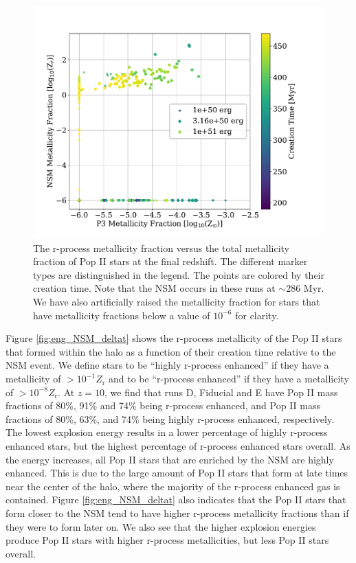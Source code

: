 \documentclass[fleqn,usenatbib]{mnras}
\begin{document}
\begin{figure} 
	\includegraphics[width=\columnwidth]{plots/eng_NSM_tot.pdf}
	\caption[R-process metallicity fraction versus the total metallicity fraction for Pop II stars in the explosion energy variation runs.]{The r-process metallicity fraction versus the total metallicity fraction of Pop II stars at the final redshift. The different marker types are distinguished in the legend. The points are colored by their creation time. Note that the NSM occurs in these runs at $\sim 286$ Myr. We have also artificially raised the metallicity fraction for stars that have metallicity fractions below a value of $10^{-6}$ for clarity.}
	\label{fig:eng_NSM_p3}
\end{figure}

Figure \ref{fig:eng_NSM_deltat} shows the r-process metallicity of the Pop II stars that formed within the halo as a function of their creation time relative to the NSM event. We define stars to be ``highly r-process enhanced'' if they have a metallicity of $> 10^{-1} Z_{\mathrm{r}}$ and to be ``r-process enhanced'' if they have a metallicity of $> 10^{-8} Z_{\mathrm{r}}$. At $z = 10$, we find that runs D, Fiducial and E have Pop II mass fractions of 80\%, 91\% and 74\% being r-process enhanced, and Pop II mass fractions of 80\%, 63\%, and 74\% being highly r-process enhanced, respectively. The lowest explosion energy results in a lower percentage of highly r-process enhanced stars, but the highest percentage of r-process enhanced stars overall. As the energy increases, all Pop II stars that are enriched by the NSM are highly enhanced. This is due to the large amount of Pop II stars that form at late times near the center of the halo, where the majority of the r-process enhanced gas is contained. Figure \ref{fig:eng_NSM_deltat} also indicates that the Pop II stars that form closer to the NSM tend to have higher r-process metallicity fractions than if they were to form later on. We also see that the higher explosion energies produce Pop II stars with higher r-process metallicities, but less Pop II stars overall. 
\end{document}
